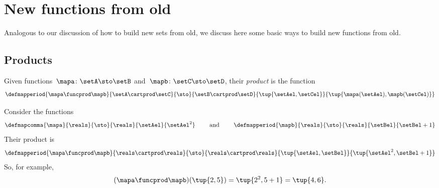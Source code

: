 


\section{New functions from old}
\label{sec:new-functions-from-old}

Analogous to our discussion of how to build new sets from old, we discuss here some basic ways to build new functions from old. 

\subsection{Products}

\begin{ctdefinition}
    \label{def:product-of-functions}
    Given functions~$\mapa\colon \setA \sto \setB$ and~$\mapb\colon \setC \sto \setD$, their \emph{product} is the function
    \begin{equation}
        \defmapperiod{
            \mapa \funcprod \mapb
        }{
            \setA \cartprod \setC
        }{
            \sto
        }{
            \setB\cartprod \setD
        }{
            \tup{\setAel, \setCel}
        }{
            \tup{\mapa(\setAel),\mapb(\setCel)}
        }
    \end{equation}
\end{ctdefinition}

\begin{example}
    Consider the functions
    \begin{equation}
        \defmapcomma{
            \mapa
        }{
            \reals
        }{
            \sto
        }{
            \reals
        }{
            \setAel
        }{
            \setAel^2
        }
    \quad \quad \text{ and }\quad \quad
        \defmapperiod{
            \mapb
        }{
            \reals
        }{
            \sto
        }{
            \reals
        }{
            \setBel
        }{
            \setBel+1
        }
    \end{equation}
Their product is 
\begin{equation}
        \defmapperiod{
            \mapa \funcprod \mapb 
        }{
            \reals \cartprod \reals
        }{
            \sto
        }{
            \reals \cartprod \reals
        }{
            \tup{\setAel,\setBel}
        }{
            \tup{\setAel^2,\setBel+1}
        }
\end{equation}
    So, for example, 
\begin{equation}
    (\mapa \funcprod \mapb)(\tup{2,5})=\tup{2^2,5+1}=\tup{4,6}.
\end{equation}
\end{example}



